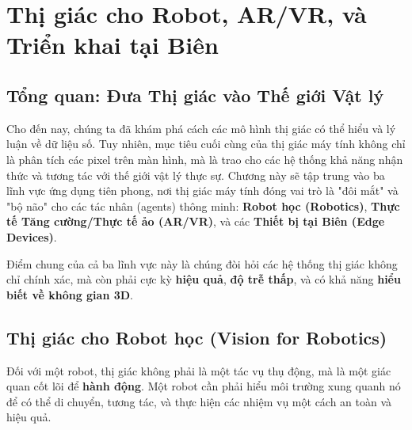 \section{Thị giác cho Robot, AR/VR, và Triển khai tại Biên}
\label{sec:vision_for_robotics_ar_vr_edge}

\subsection{Tổng quan: Đưa Thị giác vào Thế giới Vật lý}
\label{subsec:vision_physical_world_overview}
Cho đến nay, chúng ta đã khám phá cách các mô hình thị giác có thể hiểu và lý luận về dữ liệu số. Tuy nhiên, mục tiêu cuối cùng của thị giác máy tính không chỉ là phân tích các pixel trên màn hình, mà là trao cho các hệ thống khả năng nhận thức và tương tác với thế giới vật lý thực sự. Chương này sẽ tập trung vào ba lĩnh vực ứng dụng tiên phong, nơi thị giác máy tính đóng vai trò là "đôi mắt" và "bộ não" cho các tác nhân (agents) thông minh: \textbf{Robot học (Robotics)}, \textbf{Thực tế Tăng cường/Thực tế ảo (AR/VR)}, và các \textbf{Thiết bị tại Biên (Edge Devices)}.

Điểm chung của cả ba lĩnh vực này là chúng đòi hỏi các hệ thống thị giác không chỉ chính xác, mà còn phải cực kỳ \textbf{hiệu quả}, \textbf{độ trễ thấp}, và có khả năng \textbf{hiểu biết về không gian 3D}.

\subsection{Thị giác cho Robot học (Vision for Robotics)}
\label{subsec:vision_for_robotics}
Đối với một robot, thị giác không phải là một tác vụ thụ động, mà là một giác quan cốt lõi để \textbf{hành động}. Một robot cần phải hiểu môi trường xung quanh nó để có thể di chuyển, tương tác, và thực hiện các nhiệm vụ một cách an toàn và hiệu quả.


